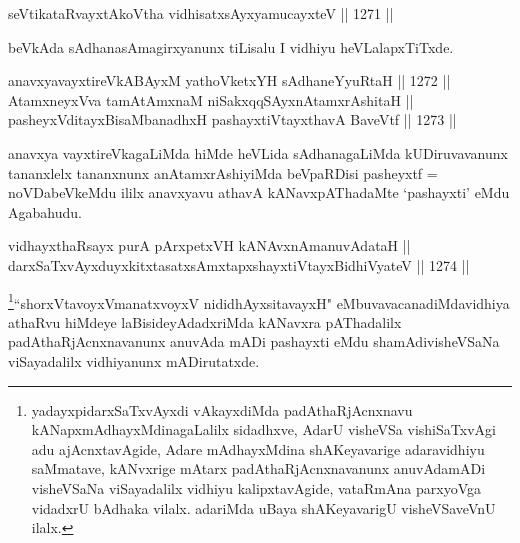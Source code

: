 \begin{shl}
seVtikataRvayxtAkoV\s tha vidhisatxsAyxyamucayxteV \hfill || 1271 ||  
\end{shl}

\begin{artha}
beVkAda sAdhanasAmagirxyanunx tiLisalu I vidhiyu heVLalapxTiTxde.
\end{artha}

\begin{shl}
anavxyavayxtireVkABAyxM yathoVketxYH sAdhaneYyuRtaH \hfill || 1272 ||  \\
AtamxneyxVva tamAtAmxnaM niSakxqqSAyxnAtamxrAshitaH ||  \\
pasheyxVditayxBisaMbanadhxH pashayxtiVtayxthavA BaveVtf \hfill || 1273 ||  
\end{shl}

\begin{artha}
anavxya vayxtireVkagaLiMda hiMde heVLida sAdhanagaLiMda kUDiruvavanunx tananxlelx tananxnunx anAtamxrAshiyiMda beVpaRDisi pasheyxtf = noVDabeVkeMdu ililx anavxyavu athavA kANavxpAThadaMte `pashayxti' eMdu Agabahudu.
\end{artha}


\begin{shl}
vidhayxthaRsayx purA pArxpetxVH kANAvxnAmanuvAdataH || \\
darxSaTxvAyxduyxkitxtasatxsAmxtapxshayxtiVtayxBidhiVyateV \hfill || 1274 ||  
\end{shl}

\begin{artha}
\footnote{yadayxpidarxSaTxvAyxdi vAkayxdiMda padAthaRjAcnxnavu kANapxmAdhayxMdinagaLalilx sidadhxve, AdarU visheVSa vishiSaTxvAgi adu ajAcnxtavAgide, Adare mAdhayxMdina shAKeyavarige adaravidhiyu saMmatave, kANvxrige mAtarx padAthaRjAcnxnavanunx anuvAdamADi visheVSaNa viSayadalilx vidhiyu kalipxtavAgide, vataRmAna parxyoVga vidadxrU bAdhaka vilalx. adariMda uBaya shAKeyavarigU visheVSaveVnU ilalx.}``shorxVtavoyxVmanatxvoyxV nididhAyxsitavayxH" eMbuvavacanadiMda\break vidhiya athaRvu hiMdeye laBisideyAdadxriMda kANavxra pAThadalilx padAthaRjAcnxnavanunx anuvAda mADi pashayxti eMdu shamAdivisheVSaNa viSayadalilx vidhiyanunx mADirutatxde. 
\end{artha}


